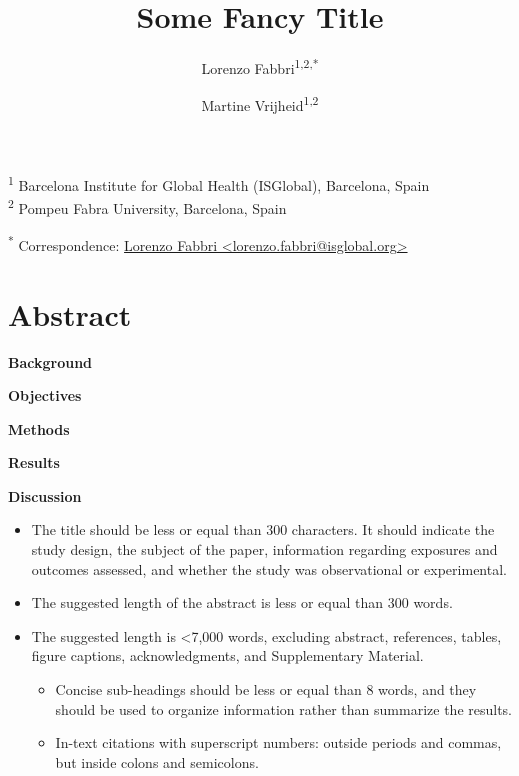 \documentclass[
  letterpaper,
  DIV=11,
  numbers=noendperiod]{scrartcl}
\title{Some Fancy Title}
\author{Lorenzo Fabbri\textsuperscript{1,2,*} \and Martine
Vrijheid\textsuperscript{1,2}}
\date{}
\providecommand{\tightlist}{%
  \setlength{\itemsep}{0pt}\setlength{\parskip}{0pt}}\usepackage{longtable,booktabs,array}
\begin{document}
\maketitle
\linenumbers

\ifdefined\Shaded\renewenvironment{Shaded}{\begin{tcolorbox}[borderline west={3pt}{0pt}{shadecolor}, interior hidden, enhanced, boxrule=0pt, breakable, sharp corners, frame hidden]}{\end{tcolorbox}}\fi

\textsuperscript{1} Barcelona Institute for Global Health (ISGlobal),
Barcelona, Spain\\
\textsuperscript{2} Pompeu Fabra University, Barcelona, Spain

\textsuperscript{*} Correspondence:
\href{mailto:lorenzo.fabbri@isglobal.org}{Lorenzo Fabbri
\textless{}lorenzo.fabbri@isglobal.org\textgreater{}}

\hypertarget{abstract}{%
\section*{Abstract}\label{abstract}}

\textbf{Background}

\textbf{Objectives}

\textbf{Methods}

\textbf{Results}

\textbf{Discussion}

\newpage

\begin{itemize}
\tightlist
\item
  The title should be less or equal than 300 characters. It should
  indicate the study design, the subject of the paper, information
  regarding exposures and outcomes assessed, and whether the study was
  observational or experimental.
\item
  The suggested length of the abstract is less or equal than 300 words.
\item
  The suggested length is \textless7,000 words, excluding abstract,
  references, tables, figure captions, acknowledgments, and
  Supplementary Material.

  \begin{itemize}
  \tightlist
  \item
    Concise sub-headings should be less or equal than 8 words, and they
    should be used to organize information rather than summarize the
    results.
  \item
    In-text citations with superscript numbers: outside periods and
    commas, but inside colons and semicolons.
  \end{itemize}
\end{itemize}
\end{document}
